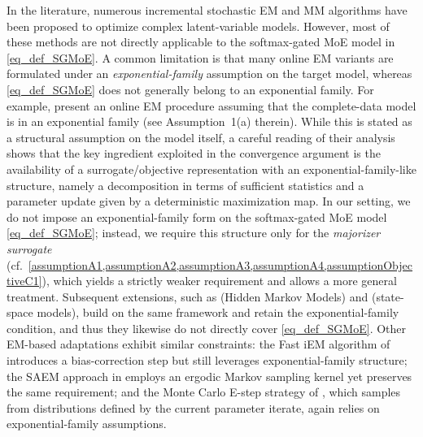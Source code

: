 \documentclass{article}
\newcommand{\md}{softmax-gated MoE }
\begin{document}
In the literature, numerous incremental stochastic EM and MM algorithms have been proposed to optimize complex latent-variable models. However, most of these methods are not directly applicable to the \md model in \cref{eq_def_SGMoE}. A common limitation is that many online EM variants are formulated under an \emph{exponential-family} assumption on the target model, whereas \cref{eq_def_SGMoE} does not generally belong to an exponential family. For example, \cite{cappe2009line} present an online EM procedure assuming that the complete-data model is in an exponential family (see Assumption~1(a) therein). While this is stated as a structural assumption on the model itself, a careful reading of their analysis shows that the key ingredient exploited in the convergence argument is the availability of a surrogate/objective representation with an exponential-family-like structure, namely a decomposition in terms of sufficient statistics and a parameter update given by a deterministic maximization map. In our setting, we do not impose an exponential-family form on the \md model \cref{eq_def_SGMoE}; instead, we require this structure only for the \emph{majorizer surrogate} (cf.~\cref{assumptionA1,assumptionA2,assumptionA3,assumptionA4,assumptionObjectiveC1}), which yields a strictly weaker requirement and allows a more general treatment. Subsequent extensions, such as \cite{cappe2011online} (Hidden Markov Models) and \cite{cappe2009online} (state-space models), build on the same framework and retain the exponential-family condition, and thus they likewise do not directly cover \cref{eq_def_SGMoE}. Other EM-based adaptations exhibit similar constraints: the Fast iEM algorithm of \cite{karimi_global_2019} introduces a bias-correction step but still leverages exponential-family structure; the SAEM approach in \cite{kuhn_properties_2020} employs an ergodic Markov sampling kernel yet preserves the same requirement; and the Monte Carlo E-step strategy of \cite{rohde2011online}, which samples from distributions defined by the current parameter iterate, again relies on exponential-family assumptions.
\end{document}
